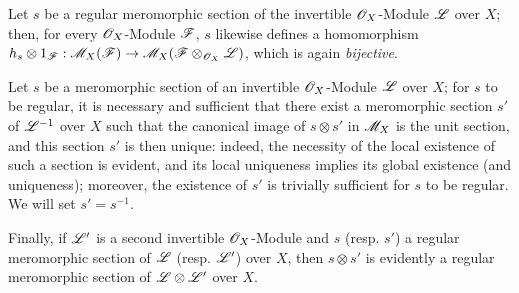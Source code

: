 \begin{env}[20.1.9]
\label{IV.20.1.9}
Let $s$ be a regular meromorphic section of the invertible $\mathscr{O}_X$-Module $\mathscr{L}$ over $X$; then, for every $\mathscr{O}_X$-Module $\mathscr{F}$, $s$ likewise defines a homomorphism $h_s\otimes1_{\mathscr{F}}:\mathscr{M}_X(\mathscr{F})\to\mathscr{M}_X(\mathscr{F}\otimes_{\mathscr{O}_X}\mathscr{L})$, which is again \emph{bijective}.
\end{env}

\begin{env}[20.1.10]
\label{IV.20.1.10}
Let $s$ be a meromorphic section of an invertible $\mathscr{O}_X$-Module $\mathscr{L}$ over $X$; for $s$ to be regular, it is necessary and sufficient that there exist a meromorphic section $s'$ of $\mathscr{L}^{-1}$ over $X$ such that the canonical image of $s\otimes s'$ in $\mathscr{M}_X$  is the unit section, and this section $s'$ is then unique: indeed, the necessity of the local existence of such a section is evident, and its local uniqueness implies its global existence (and uniqueness); moreover, the existence of $s'$ is trivially sufficient for $s$ to be regular.
We will set $s'=s^{-1}$.

Finally, if $\mathscr{L}'$ is a second invertible $\mathscr{O}_X$-Module and $s$ (resp. $s'$) a regular meromorphic section of $\mathscr{L}$ (resp. $\mathscr{L}'$) over $X$, then $s\otimes s'$ is evidently a regular meromorphic section of $\mathscr{L}\otimes\mathscr{L}'$ over $X$.
\end{env}

